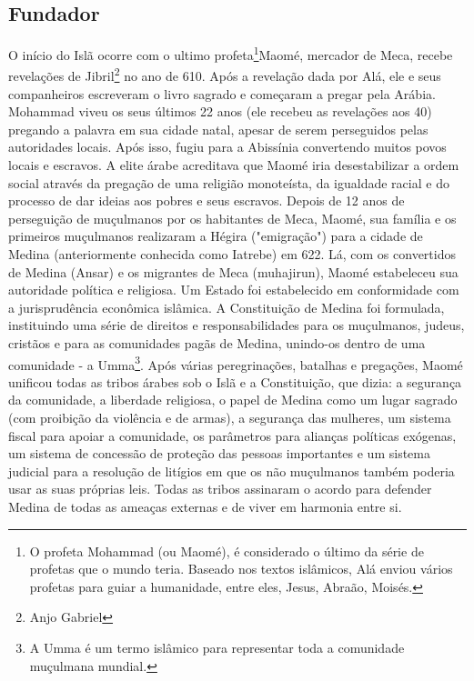 \documentclass[12pt]{article}
\begin{document}
\subsection{Fundador}
O início do Islã ocorre com o ultimo profeta\footnote{
    O profeta Mohammad (ou Maomé), é considerado o último da série de profetas que o mundo teria.
    Baseado nos textos islâmicos, Alá enviou vários profetas para guiar a humanidade, entre eles, Jesus, Abraão, Moisés.
}Maomé, mercador de Meca, recebe revelações de Jibril\footnote{Anjo Gabriel} no ano de 610.
Após a revelação dada por Alá, ele e seus companheiros escreveram o livro sagrado e começaram a pregar pela Arábia.
Mohammad viveu os seus últimos 22 anos (ele recebeu as revelações aos 40) pregando a palavra em sua cidade natal, apesar de serem perseguidos pelas autoridades locais.
Após isso, fugiu para a Abissínia convertendo muitos povos locais e escravos.
A elite árabe acreditava que Maomé iria desestabilizar a ordem social através da pregação de uma religião monoteísta, da igualdade racial e do processo de dar ideias aos pobres e seus escravos. 
Depois de 12 anos de perseguição de muçulmanos por os habitantes de Meca, Maomé, sua família e os primeiros muçulmanos realizaram a Hégira ("emigração") para a cidade de Medina (anteriormente conhecida como Iatrebe) em 622.
Lá, com os convertidos de Medina (Ansar) e os migrantes de Meca (muhajirun), Maomé estabeleceu sua autoridade política e religiosa.
Um Estado foi estabelecido em conformidade com a jurisprudência econômica islâmica.
A Constituição de Medina foi formulada, instituindo uma série de direitos e responsabilidades para os muçulmanos, judeus, cristãos e para as comunidades pagãs de Medina, unindo-os dentro de uma comunidade - a Umma\footnote{A Umma é um termo islâmico para representar toda a comunidade muçulmana mundial.}.
Após várias peregrinações, batalhas e pregações, Maomé unificou todas as tribos árabes sob o Islã e a Constituição, que dizia:
a segurança da comunidade, a liberdade religiosa, o papel de Medina como um lugar sagrado (com proibição da violência e de armas), a segurança das mulheres, um sistema fiscal para apoiar a comunidade, os parâmetros para alianças políticas exógenas, um sistema de concessão de proteção das pessoas importantes e um sistema judicial para a resolução de litígios em que os não muçulmanos também poderia usar as suas próprias leis. Todas as tribos assinaram o acordo para defender Medina de todas as ameaças externas e de viver em harmonia entre si.
\end{document}
